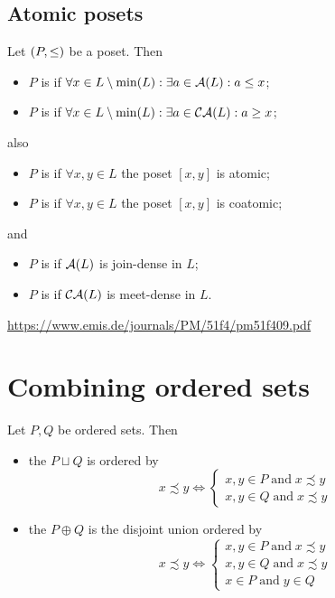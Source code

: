 \subsection{Atomic posets}
\begin{definition}
Let $\left( P,\leq \right)$ be a poset. Then
\begin{itemize}
\item $P$ is  if $\forall x\in L\setminus\min(L): \exists a\in\operatorname{\mathcal{A}}(L): a\leq x$;
\item $P$ is  if $\forall x\in L\setminus\min(L): \exists a\in\operatorname{\mathcal{CA}}(L): a\geq x$;
\end{itemize}
also
\begin{itemize}
\item $P$ is  if $\forall x,y\in L$ the poset $[x,y]$ is atomic;
\item $P$ is  if $\forall x,y \in L$ the poset $[x,y]$ is coatomic;
\end{itemize}
and
\begin{itemize}
\item $P$ is  if $\operatorname{\mathcal{A}}(L)$ is join-dense in $L$;
\item $P$ is  if $\operatorname{\mathcal{CA}}(L)$ is meet-dense in $L$.
\end{itemize}
\end{definition}

\url{https://www.emis.de/journals/PM/51f4/pm51f409.pdf}


\section{Combining ordered sets}
\begin{definition}
Let $P,Q$ be ordered sets. Then
\begin{itemize}
\item the  $P\sqcup Q$ is ordered by
\[ x\precsim y \iff \begin{cases}
x,y\in P \;\text{and}\; x\precsim y \\
x,y\in Q \;\text{and}\; x\precsim y
\end{cases} \]
\item the  $P\oplus Q$ is the disjoint union ordered by
\[ x\precsim y \iff \begin{cases}
x,y\in P \;\text{and}\; x\precsim y \\
x,y\in Q \;\text{and}\; x\precsim y \\
x\in P \;\text{and}\; y\in Q
\end{cases} \]
\end{itemize}
\end{definition}


